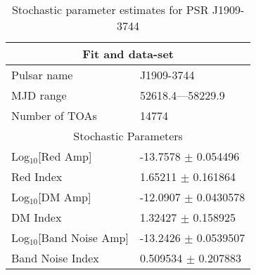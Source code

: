 \documentclass{article}
\begin{document}
\begin{table*}
\caption{Stochastic parameter estimates for PSR J1909-3744}
\begin{tabular}{ll}
\hline\hline
\multicolumn{2}{c}{Fit and data-set} \\ 
\hline
Pulsar name\dotfill & J1909-3744 \\ 
MJD range\dotfill & 52618.4---58229.9 \\ 
Number of TOAs\dotfill & 14774 \\
\hline
\multicolumn{2}{c}{Stochastic Parameters} \\ 
\hline
Log$_{10}$[Red Amp] \dotfill & -13.7578 $\pm$ 0.054496  \\ 
Red Index \dotfill & 1.65211 $\pm$ 0.161864  \\ 
Log$_{10}$[DM Amp] \dotfill & -12.0907 $\pm$ 0.0430578  \\ 
DM Index \dotfill & 1.32427 $\pm$ 0.158925  \\ 
Log$_{10}$[Band Noise Amp] \dotfill & -13.2426 $\pm$ 0.0539507  \\ 
Band Noise Index \dotfill & 0.509534 $\pm$ 0.207883  \\ 
\hline
\end{tabular}
\label{Table:J1909-3744}
\end{table*} 
\end{document}
